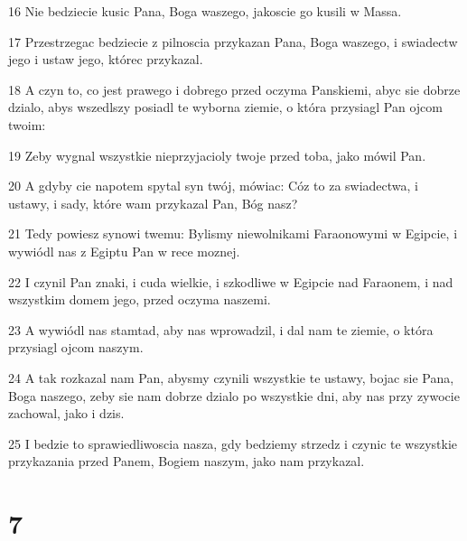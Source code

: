\par 16 Nie bedziecie kusic Pana, Boga waszego, jakoscie go kusili w Massa.
\par 17 Przestrzegac bedziecie z pilnoscia przykazan Pana, Boga waszego, i swiadectw jego i ustaw jego, którec przykazal.
\par 18 A czyn to, co jest prawego i dobrego przed oczyma Panskiemi, abyc sie dobrze dzialo, abys wszedlszy posiadl te wyborna ziemie, o która przysiagl Pan ojcom twoim:
\par 19 Zeby wygnal wszystkie nieprzyjacioly twoje przed toba, jako mówil Pan.
\par 20 A gdyby cie napotem spytal syn twój, mówiac: Cóz to za swiadectwa, i ustawy, i sady, które wam przykazal Pan, Bóg nasz?
\par 21 Tedy powiesz synowi twemu: Bylismy niewolnikami Faraonowymi w Egipcie, i wywiódl nas z Egiptu Pan w rece moznej.
\par 22 I czynil Pan znaki, i cuda wielkie, i szkodliwe w Egipcie nad Faraonem, i nad wszystkim domem jego, przed oczyma naszemi.
\par 23 A wywiódl nas stamtad, aby nas wprowadzil, i dal nam te ziemie, o która przysiagl ojcom naszym.
\par 24 A tak rozkazal nam Pan, abysmy czynili wszystkie te ustawy, bojac sie Pana, Boga naszego, zeby sie nam dobrze dzialo po wszystkie dni, aby nas przy zywocie zachowal, jako i dzis.
\par 25 I bedzie to sprawiedliwoscia nasza, gdy bedziemy strzedz i czynic te wszystkie przykazania przed Panem, Bogiem naszym, jako nam przykazal.

\chapter{7}

